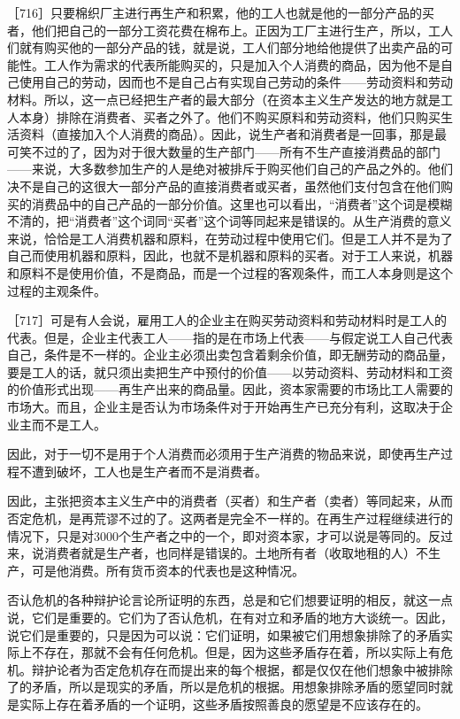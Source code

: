 ［716］只要棉织厂主进行再生产和积累，他的工人也就是他的一部分产品的买者，他们把自己的一部分工资花费在棉布上。正因为工厂主进行生产，所以，工人们就有购买他的一部分产品的钱，就是说，工人们部分地给他提供了出卖产品的可能性。工人作为需求的代表所能购买的，只是加入个人消费的商品，因为他不是自己使用自己的劳动，因而也不是自己占有实现自己劳动的条件——劳动资料和劳动材料。所以，这一点已经把生产者的最大部分（在资本主义生产发达的地方就是工人本身）排除在消费者、买者之外了。他们不购买原料和劳动资料，他们只购买生活资料（直接加入个人消费的商品）。因此，说生产者和消费者是一回事，那是最可笑不过的了，因为对于很大数量的生产部门——所有不生产直接消费品的部门——来说，大多数参加生产的人是绝对被排斥于购买他们自己的产品之外的。他们决不是自己的这很大一部分产品的直接消费者或买者，虽然他们支付包含在他们购买的消费品中的自己产品的一部分价值。这里也可以看出，“消费者”这个词是模糊不清的，把“消费者”这个词同“买者”这个词等同起来是错误的。从生产消费的意义来说，恰恰是工人消费机器和原料，在劳动过程中使用它们。但是工人并不是为了自己而使用机器和原料，因此，也就不是机器和原料的买者。对于工人来说，机器和原料不是使用价值，不是商品，而是一个过程的客观条件，而工人本身则是这个过程的主观条件。

［717］可是有人会说，雇用工人的企业主在购买劳动资料和劳动材料时是工人的代表。但是，企业主代表工人——指的是在市场上代表——与假定说工人自己代表自己，条件是不一样的。企业主必须出卖包含着剩余价值，即无酬劳动的商品量，要是工人的话，就只须出卖把生产中预付的价值——以劳动资料、劳动材料和工资的价值形式出现——再生产出来的商品量。因此，资本家需要的市场比工人需要的市场大。而且，企业主是否认为市场条件对于开始再生产已充分有利，这取决于企业主而不是工人。

因此，对于一切不是用于个人消费而必须用于生产消费的物品来说，即使再生产过程不遭到破坏，工人也是生产者而不是消费者。

因此，主张把资本主义生产中的消费者（买者）和生产者（卖者）等同起来，从而否定危机，是再荒谬不过的了。这两者是完全不一样的。在再生产过程继续进行的情况下，只是对3000个生产者之中的一个，即对资本家，才可以说是等同的。反过来，说消费者就是生产者，也同样是错误的。土地所有者（收取地租的人）不生产，可是他消费。所有货币资本的代表也是这种情况。

否认危机的各种辩护论言论所证明的东西，总是和它们想要证明的相反，就这一点说，它们是重要的。它们为了否认危机，在有对立和矛盾的地方大谈统一。因此，说它们是重要的，只是因为可以说：它们证明，如果被它们用想象排除了的矛盾实际上不存在，那就不会有任何危机。但是，因为这些矛盾存在着，所以实际上有危机。辩护论者为否定危机存在而提出来的每个根据，都是仅仅在他们想象中被排除了的矛盾，所以是现实的矛盾，所以是危机的根据。用想象排除矛盾的愿望同时就是实际上存在着矛盾的一个证明，这些矛盾按照善良的愿望是不应该存在的。

